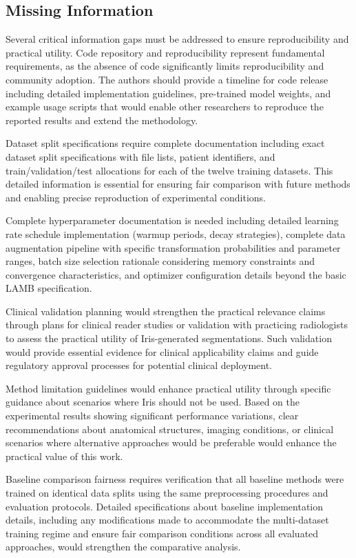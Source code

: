 \subsection{Missing Information}
Several critical information gaps must be addressed to ensure reproducibility and practical utility. Code repository and reproducibility represent fundamental requirements, as the absence of code significantly limits reproducibility and community adoption. The authors should provide a timeline for code release including detailed implementation guidelines, pre-trained model weights, and example usage scripts that would enable other researchers to reproduce the reported results and extend the methodology.

Dataset split specifications require complete documentation including exact dataset split specifications with file lists, patient identifiers, and train/validation/test allocations for each of the twelve training datasets. This detailed information is essential for ensuring fair comparison with future methods and enabling precise reproduction of experimental conditions.

Complete hyperparameter documentation is needed including detailed learning rate schedule implementation (warmup periods, decay strategies), complete data augmentation pipeline with specific transformation probabilities and parameter ranges, batch size selection rationale considering memory constraints and convergence characteristics, and optimizer configuration details beyond the basic LAMB specification.

Clinical validation planning would strengthen the practical relevance claims through plans for clinical reader studies or validation with practicing radiologists to assess the practical utility of Iris-generated segmentations. Such validation would provide essential evidence for clinical applicability claims and guide regulatory approval processes for potential clinical deployment.

Method limitation guidelines would enhance practical utility through specific guidance about scenarios where Iris should not be used. Based on the experimental results showing significant performance variations, clear recommendations about anatomical structures, imaging conditions, or clinical scenarios where alternative approaches would be preferable would enhance the practical value of this work.

Baseline comparison fairness requires verification that all baseline methods were trained on identical data splits using the same preprocessing procedures and evaluation protocols. Detailed specifications about baseline implementation details, including any modifications made to accommodate the multi-dataset training regime and ensure fair comparison conditions across all evaluated approaches, would strengthen the comparative analysis.
